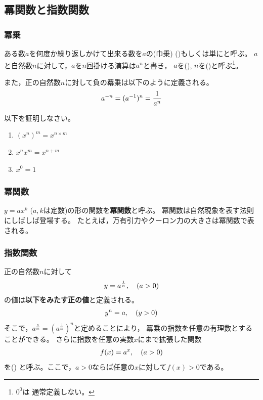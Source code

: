 \documentclass[twocolumn,11pt]{jarticle}
\begin{document}


\subsection{冪関数と指数関数}
\subsubsection{冪乗}

ある数$a$を何度か繰り返しかけて出来る数を$a$の(巾乗)
()もしくは単にと呼ぶ。
$a$と自然数$n$に対して，$a$を$n$回掛ける演算は$a^n$と書き，
$a$を(),
$n$を()と呼ぶ\footnote{$0^0$は
  通常定義しない。}。

また，正の自然数$n$に対して負の羃乗は以下のように定義される。
\begin{align}
  a^{-n}=(a^{-1})^n=\frac{1}{a^n}\notag
\end{align}

\nquestion
以下を証明しなさい。
\begin{enumerate}
\item $(x^n)^m=x^{n\times m}$
 \item $x^nx^m=x^{n+m}$
\item $x^0=1$
\end{enumerate}

\subsubsection{冪関数}
$y=ax^k$ ($a, k$は定数)の形の関数を\textbf{冪関数}と呼ぶ。
冪関数は自然現象を表す法則にしばしば登場する。
たとえば，万有引力やクーロン力の大きさは冪関数で表される。

\subsubsection{指数関数}
正の自然数$n$に対して
\begin{align}
  y=a^\frac{1}{n}, \quad(a>0)\notag
\end{align}
の値は\textbf{以下をみたす正の値}と定義される。
\begin{align}
  y^n=a,\quad (y>0)\notag
\end{align}
そこで，$a^\frac{n}{m}=\left(a^\frac{1}{m}\right)^n$と定めることにより，
羃乗の指数を任意の有理数とすることができる。
さらに指数を任意の実数$x$にまで拡張した関数
\begin{align}
f(x)=a^x,\quad (a>0)\notag
\end{align}
を()
と呼ぶ。ここで，$a>0$ならば任意の$x$に対して$f(x)>0$である。
\end{document}
